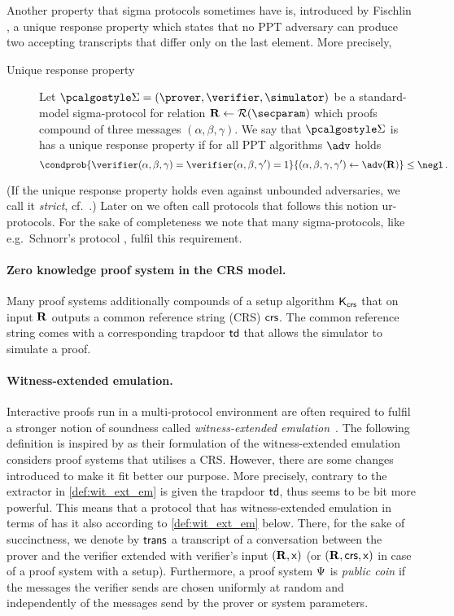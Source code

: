 \documentclass[runningheads,11pt]{llncs}
\theoremstyle{definition}
\begin{document}
Another property that sigma protocols sometimes have is, introduced by Fischlin \cite{C:Fischlin05}, a unique response property which states that no PPT adversary  can produce two accepting transcripts that differ only on the last element.
More precisely,
\begin{description}
	\item[Unique response property] Let $\sigmaprot = (\prover, \verifier, \simulator)$ be a standard-model sigma-protocol for relation $\REL \gets \RELGEN(\secparam)$ which proofs compound of three messages $(\alpha, \beta, \gamma)$. We say that $\sigmaprot$ is has a unique response property if for all PPT algorithms $\adv$ holds
	\[
	\condprob{\verifier (\alpha, \beta, \gamma) = \verifier (\alpha, \beta, \gamma')  = 1}{(\alpha, \beta, \gamma, \gamma') \gets \adv(\REL)} \leq \negl\,.
	\]
\end{description}
(If the unique response property holds even against unbounded adversaries, we call it \emph{strict}, cf.~\cite{INDOCRYPT:FKMV12}.)
Later on we often call protocols that follows this notion ur-protocols.
For the sake of completeness we note that many sigma-protocols, like e.g.~Schnorr's protocol \cite{C:Schnorr89}, fulfil this requirement.

\paragraph{Zero knowledge proof system in the CRS model.}
Many proof systems additionally compounds of a setup algorithm $\mathsf{K}_{\mathsf{crs}}$ that on input $\mathbf{R}$ outputs a common reference string (CRS) $\mathsf{crs}$. The common reference string comes with a corresponding trapdoor $\mathsf{td}$ that allows the simulator to simulate a proof.

\paragraph{Witness-extended emulation.}
Interactive proofs run in a multi-protocol environment are often required to fulfil a stronger notion of soundness called \emph{witness-extended emulation}~\cite{JC:Lindell03}.
The following definition is inspired by  \cite{EC:GroIsh08} as their formulation
of the witness-extended emulation considers proof systems that utilises a CRS.
However, there are some changes introduced to make it fit better our purpose.
More precisely, contrary to \cite{EC:GroIsh08,EC:BCCGP16} the extractor in
\cref{def:wit_ext_em} is given the trapdoor $\mathsf{td}$, thus seems to be bit more
powerful.
This means that a protocol that has witness-extended emulation in terms of \cite{EC:GroIsh08} has it also according to \cref{def:wit_ext_em} below.
There, for the sake of succinctness, we denote by $\mathsf{trans}$ a transcript of a conversation between the prover and the verifier extended with verifier's input $(\mathbf{R}, \mathsf{x})$ (or $(\mathbf{R}, \mathsf{crs}, \mathsf{x})$ in case of a proof system with a setup).
Furthermore, a proof system $\mathrm{\Psi}$ is \emph{public coin} if the messages the verifier sends are chosen uniformly at random and independently of the messages send by the prover or system parameters.
\end{document}
